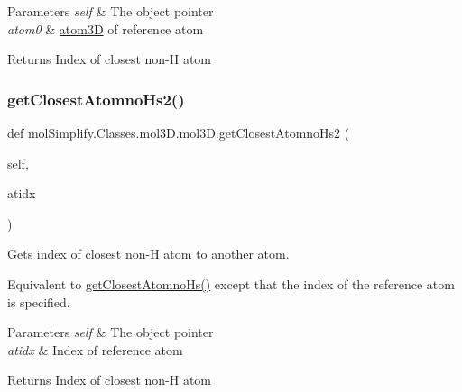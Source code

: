 \begin{DoxyParams}{Parameters}
{\em self} & The object pointer \\
\hline
{\em atom0} & \hyperlink{namespacemolSimplify_1_1Classes_1_1atom3D}{atom3D} of reference atom \\
\hline
\end{DoxyParams}
\begin{DoxyReturn}{Returns}
Index of closest non-\/H atom 
\end{DoxyReturn}
\mbox{\label{classmolSimplify_1_1Classes_1_1mol3D_1_1mol3D_a911ffafa9384284b123be8c1670220ca}} 
\subsubsection{\texorpdfstring{get\+Closest\+Atomno\+Hs2()}{getClosestAtomnoHs2()}}
{\footnotesize\ttfamily def mol\+Simplify.\+Classes.\+mol3\+D.\+mol3\+D.\+get\+Closest\+Atomno\+Hs2 (\begin{DoxyParamCaption}\item[{}]{self,  }\item[{}]{atidx }\end{DoxyParamCaption})}



Gets index of closest non-\/H atom to another atom. 

Equivalent to \hyperlink{classmolSimplify_1_1Classes_1_1mol3D_1_1mol3D_a3f137b174fb3b427893ed88d685888ce}{get\+Closest\+Atomno\+Hs()} except that the index of the reference atom is specified. 
\begin{DoxyParams}{Parameters}
{\em self} & The object pointer \\
\hline
{\em atidx} & Index of reference atom \\
\hline
\end{DoxyParams}
\begin{DoxyReturn}{Returns}
Index of closest non-\/H atom 
\end{DoxyReturn}
\mbox{\label{classmolSimplify_1_1Classes_1_1mol3D_1_1mol3D_abdd4f09ed5f39c96a5025fa9d049f2e8}} 
